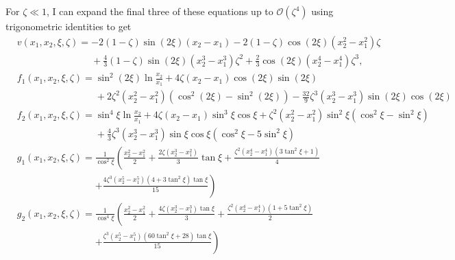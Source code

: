 \documentclass[12pt]{article}
\begin{document}
For $\zeta\ll1$, I can expand the final three of these equations up to $\mathcal{O}(\zeta^4)$ using trigonometric identities to get
\begin{subequations}
\begin{align}
&v(x_1,x_2,\xi,\zeta)= -2(1-\zeta)\sin(2\xi)(x_2-x_1)-2(1-\zeta)\cos(2\xi)(x_2^2-x_1^2)\zeta\nonumber\\
&\phantom{v(x_1,x_2,\xi,\zeta)= }+\frac{4}{3}(1-\zeta)\sin(2\xi)(x_2^3-x_1^3)\zeta^2+\frac{2}{3}\cos(2\xi)(x_2^4-x_1^4)\zeta^3,\\
&f_1(x_1,x_2,\xi,\zeta)=\sin^2\left(2\xi\right)\ln\frac{x_2}{x_1}+4\zeta(x_2-x_1)\cos(2\xi)\sin(2\xi)\nonumber\\
&\phantom{f_1(x_1,x_2,\xi,\zeta)=}+2\zeta^2(x_2^2-x_1^2)\left(\cos^2(2\xi)-\sin^2(2\xi)\right)-\frac{32}{9}\zeta^3(x_2^3-x_1^3)\sin(2\xi)\cos(2\xi)\\
&f_2(x_1,x_2,\xi,\zeta)=\sin^4\xi\ln\frac{x_2}{x_1}+4\zeta(x_2-x_1)\sin^3\xi\cos\xi+\zeta^2(x_2^2-x_1^2)\sin^2\xi(\cos^2\xi-\sin^2\xi)\nonumber\\
&\phantom{f_2(x_1,x_2,\xi,\zeta)=}+\frac{4}{3}\zeta^3(x_2^3-x_1^3)\sin\xi\cos\xi\left(\cos^2\xi-5\sin^2\xi\right)\\
&g_1(x_1,x_2,\xi,\zeta)=\frac{1}{\cos^2\xi}\left(\frac{x_2^2-x_1^2}{2}+\frac{2\zeta(x_2^3-x_1^2)}{3}\tan\xi+\frac{\zeta^2(x_2^4-x_1^4)(3\tan^2\xi+1)}{4}\right.\nonumber\\
&\phantom{g_1(x_1,x_2,\xi,\zeta)=}\left.+\frac{4\zeta^3(x_2^5-x_1^5)(4+3\tan^2\xi)\tan\xi}{15}\right)\\
&g_2(x_1,x_2,\xi,\zeta)=\frac{1}{\cos^4\xi}\left(\frac{x_2^2-x_1^2}{2}+\frac{4\zeta(x_2^3-x_1^3)\tan\xi}{3}+\frac{\zeta^2(x_2^4-x_1^4)(1+5\tan^2\xi)}{2}\right.\nonumber\\
&\phantom{g_2(x_1,x_2,\xi,\zeta)=}\left.+\frac{\zeta^3(x_2^5-x_1^5)(60\tan^2\xi+28)\tan\xi}{15}\right)
\end{align}
\end{subequations}
\end{document}
